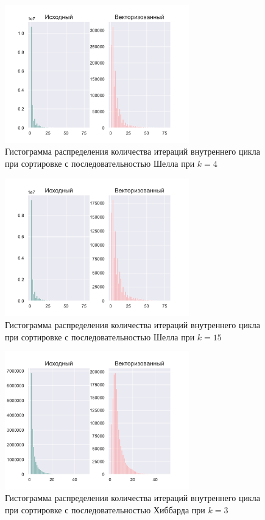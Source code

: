 \documentclass[utf8]{psta}
\begin{document}
\begin{figure}
\includegraphics[width=8cm,height=6cm]{pics/pic_shell_k_4}
\caption{Гистограмма распределения количества итераций внутреннего цикла при сортировке с последовательностью Шелла при $k = 4$}
\label{pic:shell_k_4}
\end{figure}

\begin{figure}
\includegraphics[width=8cm,height=6cm]{pics/pic_shell_k_15}
\caption{Гистограмма распределения количества итераций внутреннего цикла при сортировке с последовательностью Шелла при $k = 15$}
\label{pic:shell_k_15}
\end{figure}

\begin{figure}
\includegraphics[width=8cm,height=6cm]{pics/pic_hibbard_k_3}
\caption{Гистограмма распределения количества итераций внутреннего цикла при сортировке с последовательностью Хиббарда при $k = 3$}
\label{pic:hibbard_k_3}
\end{figure}
\end{document}
